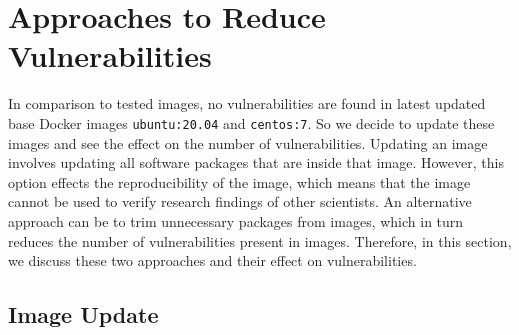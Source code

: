 %
%
\section{Approaches to Reduce Vulnerabilities}

In comparison to tested images, no vulnerabilities are found in latest
updated base
Docker images \texttt{ubuntu:20.04} and \texttt{centos:7}.
So we decide to update these images and see the effect on the
number of vulnerabilities.
Updating an image involves updating all software packages that are
inside that image. However, this option effects the reproducibility
of the image, which means that the image cannot be used to verify research
findings of other scientists. An alternative approach can be to trim unnecessary
packages from images, which in turn reduces the number of vulnerabilities
present in images. Therefore, in this section, we discuss these two
approaches and their effect on vulnerabilities.

\subsection{Image Update}

